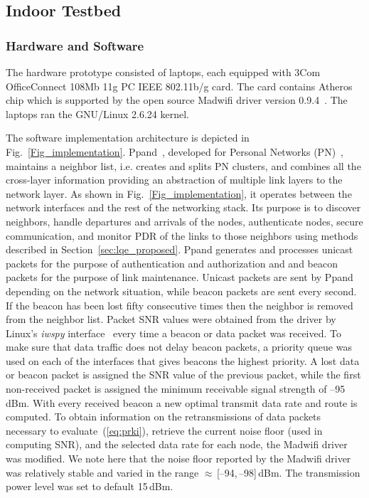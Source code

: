 \documentclass[11pt,draftclsnofoot,journal,onecolumn]{IEEEtran}
\begin{document}
\subsection{Indoor Testbed}
\label{sec:indoor_testbed}

\subsubsection{Hardware and Software}
\label{sec:hardware}

The hardware prototype consisted of laptops, each equipped with 3Com OfficeConnect 108Mb 11g PC IEEE 802.11b/g card. The card contains Atheros chip which is supported by the open source Madwifi driver version 0.9.4~\cite{MadWifi}. The laptops ran the GNU/Linux 2.6.24 kernel.

The software implementation architecture is depicted in Fig.~\ref{Fig_implementation}. Ppand~\cite{Jacobsson_phd_thesis}, developed for Personal Networks (PN)~\cite{Niemegeers_WPC2004}, maintains a neighbor list, i.e. creates and splits PN clusters, and combines all the cross-layer information providing an abstraction of multiple link layers to the network layer. As shown in Fig.~\ref{Fig_implementation}, it operates between the network interfaces and the rest of the networking stack. Its purpose is to discover neighbors, handle departures and arrivals of the nodes, authenticate nodes, secure communication, and monitor PDR of the links to those neighbors using methods described in Section~\ref{sec:lqe_proposed}. Ppand generates and processes unicast packets for the purpose of authentication and authorization and and beacon packets for the purpose of link maintenance. Unicast packets are sent by Ppand depending on the network situation, while beacon packets are sent every second. If the beacon has been lost fifty consecutive times then the neighbor is removed from the neighbor list. Packet SNR values were obtained from the driver by Linux's \textit{iwspy} interface~\cite{www:wireless_tools} every time a beacon or data packet was received. To make sure that data traffic does not delay beacon packets, a priority queue was used on each of the interfaces that gives beacons the highest priority. A lost data or beacon packet is assigned the SNR value of the previous packet, while the first non-received packet is assigned the minimum receivable signal strength of --95\,dBm. With every received beacon a new optimal transmit data rate and route is computed. To obtain information on the retransmissions of data packets necessary to evaluate~(\ref{eq:prki}), retrieve the current noise floor (used in computing SNR), and the selected data rate for each node, the Madwifi driver was modified. We note here that the noise floor reported by the Madwifi driver was relatively stable and varied in the range $\approx$\,[--94,\,--98]\,dBm. The transmission power level was set to default 15\,dBm.
\end{document}
